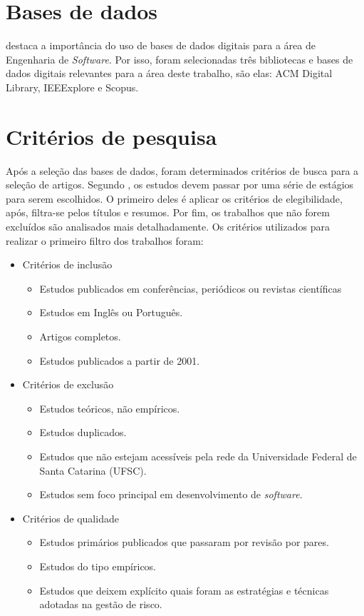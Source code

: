 \documentclass[
    12pt,       %
    openright,      %
    twoside,      %
    a4paper,      %
    english,      %
    french,       %
    spanish,      %
    brazil,       %
    ]{abntex2}
\begin{document}
\section{Bases de dados}

 destaca a importância do uso de bases de dados digitais para a área de Engenharia de \textit{Software}. Por isso, foram selecionadas três bibliotecas e bases de dados digitais relevantes para a área deste trabalho, são elas: ACM Digital Library, IEEExplore e Scopus. 

\section{Critérios de pesquisa}

Após a seleção das bases de dados, foram determinados critérios de busca para a seleção de artigos. Segundo , os estudos devem passar por uma série de estágios para serem escolhidos. O primeiro deles é aplicar os critérios de elegibilidade, após, filtra-se pelos títulos e resumos. Por fim, os trabalhos que não forem excluídos são analisados mais detalhadamente. Os critérios utilizados para realizar o primeiro filtro dos trabalhos foram:

\begin{itemize}
    \item Critérios de inclusão
        \begin{itemize}
            \item Estudos publicados em conferências, periódicos ou revistas científicas
            \item Estudos em Inglês ou Português.
            \item Artigos completos.
            \item Estudos publicados a partir de 2001.
        \end{itemize}
    \item Critérios de exclusão
        \begin{itemize}
            \item Estudos teóricos, não empíricos.
            \item Estudos duplicados.
            \item Estudos que não estejam acessíveis pela rede da Universidade Federal de Santa Catarina (UFSC).
            \item Estudos sem foco principal em desenvolvimento de \textit{software}.
        \end{itemize}
    \item Critérios de qualidade
        \begin{itemize}
            \item Estudos primários publicados que passaram por revisão por pares.
            \item Estudos do tipo empíricos.
            \item Estudos que deixem explícito quais foram as estratégias e técnicas adotadas na gestão de risco.
        \end{itemize}
\end{itemize}
\end{document}

